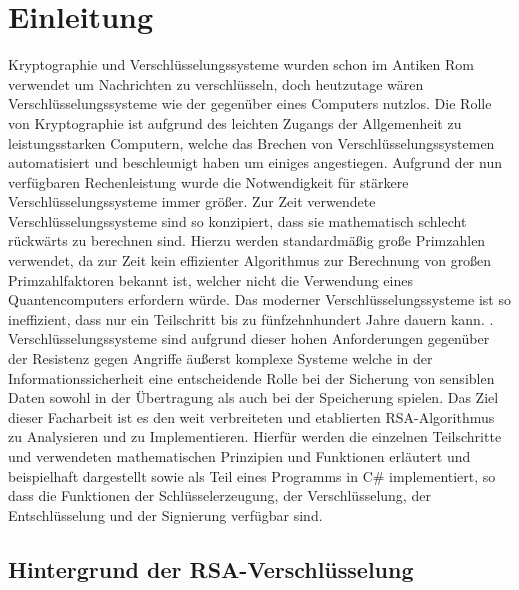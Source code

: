 \chapter{Einleitung}

Kryptographie und Verschlüsselungssysteme wurden schon im Antiken Rom verwendet um Nachrichten zu verschlüsseln\cite{aichner22}, doch heutzutage wären Verschlüsselungssysteme wie der  gegenüber eines Computers nutzlos.
Die Rolle von Kryptographie ist aufgrund des leichten Zugangs der Allgemenheit zu leistungsstarken Computern, welche das Brechen von  Verschlüsselungssystemen automatisiert und beschleunigt haben um einiges angestiegen.
Aufgrund der nun verfügbaren Rechenleistung wurde die Notwendigkeit für stärkere Verschlüsselungssysteme immer größer. Zur Zeit verwendete Verschlüsselungssysteme sind so konzipiert, dass sie mathematisch schlecht rückwärts zu berechnen sind.
Hierzu werden standardmäßig große Primzahlen verwendet, da zur Zeit kein effizienter Algorithmus zur Berechnung von großen Primzahlfaktoren bekannt ist, welcher nicht die Verwendung eines Quantencomputers erfordern würde.
Das  moderner Verschlüsselungssysteme ist so ineffizient, dass nur ein Teilschritt bis zu fünfzehnhundert Jahre dauern kann\cite{kleinjung10}.
\cite{kleinjung10}.
Verschlüsselungssysteme sind aufgrund dieser hohen Anforderungen gegenüber der Resistenz gegen Angriffe äußerst komplexe Systeme welche in der Informationssicherheit eine entscheidende Rolle bei der Sicherung von sensiblen Daten sowohl in der Übertragung als auch bei der Speicherung spielen\cite{aichner22}.
Das Ziel dieser Facharbeit ist es den weit verbreiteten und etablierten RSA-Algorithmus zu Analysieren und zu Implementieren. Hierfür werden die einzelnen Teilschritte und verwendeten mathematischen Prinzipien und Funktionen erläutert und beispielhaft dargestellt sowie als Teil eines Programms in C\# implementiert, so dass die Funktionen der Schlüsselerzeugung, der Verschlüsselung, der Entschlüsselung und der Signierung verfügbar sind.
\newpage

\section{Hintergrund der RSA-Verschlüsselung}

